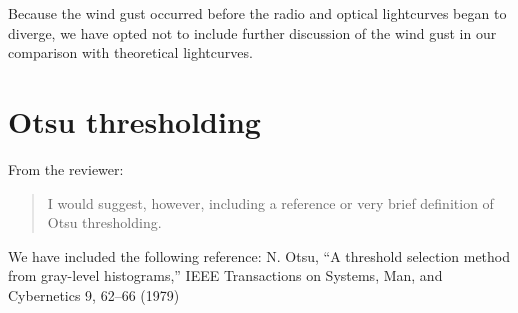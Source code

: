 \documentclass{article}
\begin{document}
\noindent Because the wind gust occurred before the radio and optical lightcurves began to diverge, we have opted not to include further discussion of the wind gust in our comparison with theoretical lightcurves.

\section{Otsu thresholding}

From the reviewer:

\begin{quote}
  I would suggest, however, including a reference or very brief definition of Otsu thresholding.
\end{quote}

\noindent We have included the following reference: N. Otsu, “A threshold selection method from gray-level histograms,” IEEE Transactions on Systems, Man, and Cybernetics 9, 62–66 (1979)
\end{document}

